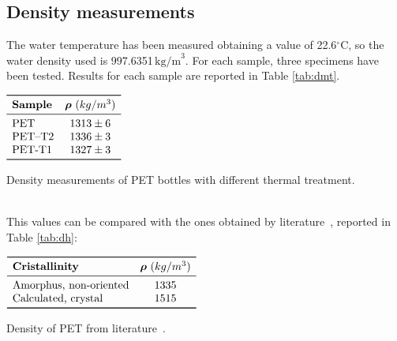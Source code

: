 \documentclass[a4paper, 11pt]{article}
\begin{document}
\subsection{Density measurements}

The water temperature has been measured  obtaining a value of 22.6$^\circ$C, so the water density used is 997.6351$\, \text{kg/m}^{3}$. For each sample, three specimens have been tested. Results for each sample are reported in Table \ref{tab:dmt}. 
\begin{table}[htp]
\centering
$
\begin{array}{lcc}
\toprule
\textbf{Sample} & \boldsymbol{\rho}\,\,({kg/m^{3}})\\
\midrule
\text{PET} & 1313\pm 6\\
\text{PET–T2} & 1336\pm 3 \\
\text{PET-T1} & 1327\pm 3 \\
\bottomrule
\end{array}
$
\caption{Density measurements of PET bottles with different thermal treatment.}
\label{tab:dmt}
\end{table}\\
This values can be compared with the ones obtained by literature~\cite{handbook}, reported in Table \ref{tab:dh}:
\begin{table}[htp]
\centering
$
\begin{array}{lc}
\toprule
\textbf{Cristallinity} & \boldsymbol{\rho}\,\,({kg/m^{3}})\\
\midrule
\text{Amorphus, non-oriented} & 1335\\
\text{Calculated, crystal} & 1515 \\
\bottomrule
\end{array}
$
\caption{Density of PET from literature~\cite{handbook}.}
\label{tab:dh}
\end{table}
\end{document}
